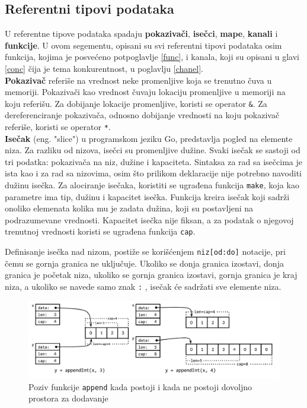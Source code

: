 \documentclass[12pt,oneside]{memoir}
\begin{document}
\subsection{Referentni tipovi podataka}
U referentne tipove podataka spadaju \textbf{pokazivači}, \textbf{isečci}, \textbf{mape}, \textbf{kanali} i \textbf{funkcije}. U ovom segementu, opisani su svi referentni tipovi podataka osim funkcija, kojima je posvećeno potpoglavlje \ref{func}, i kanala, koji su opisani u glavi \ref{conc} čija je tema konkurentnost, u poglavlju \ref{chanel}. 
\\

\textbf{Pokazivač} referiše na vrednost neke promenljive koja se trenutno čuva u memoriji. Pokazivači kao vrednost čuvaju lokaciju promenljive u memoriji na koju referišu. Za dobijanje lokacije promenljive, koristi se operator \texttt{\&}. Za dereferenciranje pokazivača, odnosno dobijanje vrednosti na koju pokazivač referiše, koristi se operator \texttt{*}.
\\

\textbf{Isečak} (eng. "slice") u programskom jeziku Go, predstavlja pogled na elemente niza. Za razliku od nizova, isečci su promenljive dužine. Svaki isečak se sastoji od tri podatka: pokazivača na niz, dužine i kapaciteta. Sintaksa za rad sa isečcima je ista kao i za rad sa nizovima, osim što prilikom deklaracije nije potrebno navoditi dužinu isečka. Za alociranje isečaka, koristiti se ugrađena funkcija \texttt{make}, koja kao parametre ima tip, dužinu i kapacitet isečka. Funkcija kreira isečak koji sadrži onoliko elemenata kolika mu je zadata dužina, koji su postavljeni na podrazumevane vrednosti. Kapacitet isečka nije fiksan, a za podatak o njegovoj trenutnoj vrednosti koristi se ugrađena funkcija \texttt{cap}.

Definisanje isečka nad nizom, postiže se korišćenjem \texttt{niz[od:do]} notacije, pri čemu se gornja granica ne uključuje. Ukoliko se donja granica izostavi, donja granica je početak niza, ukoliko se gornja granica izostavi, gornja granica je kraj niza, a ukoliko se navede samo znak \texttt{:} , isečak će sadržati sve elemente niza. 

\begin{figure}
\begin{center}
\includegraphics[scale=0.37]{slice.png}
\end{center}
\caption{Poziv funkcije \texttt{append} kada postoji i kada ne postoji dovoljno prostora za dodavanje}
\label{fig:slice}
\end{figure}
\end{document}
